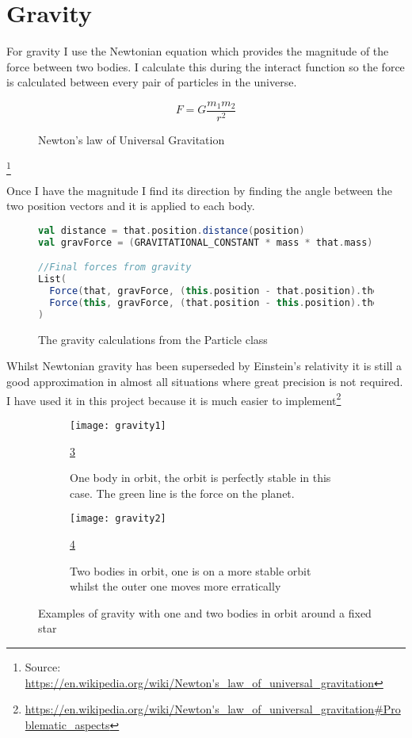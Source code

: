 \section{Gravity}
	For gravity I use the Newtonian equation which provides the magnitude of the force between two bodies. I calculate this during the interact function so the force is calculated between every pair of particles in the universe.
	\begin{figure}[h]
		\begin{equation}
		F = G\frac{m_{1}m_{2}}{r^{2}}
		\end{equation}
		\caption{Newton's law of Universal Gravitation}
		\label{fig:gravEqn}
	\end{figure}\footnote{Source: \url{https://en.wikipedia.org/wiki/Newton's_law_of_universal_gravitation}}
	
	Once I have the magnitude I find its direction by finding the angle between the two position vectors and it is applied to each body.
	\begin{figure}[h]
		\centering
		\begin{lstlisting}[language=Scala]
val distance = that.position.distance(position)
val gravForce = (GRAVITATIONAL_CONSTANT * mass * that.mass) / Math.pow(distance, 2)

//Final forces from gravity
List(
  Force(that, gravForce, (this.position - that.position).theta),
  Force(this, gravForce, (that.position - this.position).theta)
)
		\end{lstlisting}
		\caption{The gravity calculations from the Particle class}
		\label{fig:gravCode}
	\end{figure}
	
	Whilst Newtonian gravity has been superseded by Einstein's relativity it is still a good approximation in almost all situations where great precision is not required. I have used it in this project because it is much easier to implement\footnote{\url{https://en.wikipedia.org/wiki/Newton's_law_of_universal_gravitation\#Problematic_aspects}}
	
	\begin{figure}[p]
		\centering
		\begin{subfigure}{0.9\textwidth}
			\centering
			\texttt{[image: gravity1]}
			\caption{One body in orbit, the orbit is perfectly stable in this case. The green line is the force on the planet.}
			\label{fig:gravExamplesSub1}
			\ref{fig:gravExamplesSub1}
		\end{subfigure}
		\begin{subfigure}{0.9\textwidth}
			\centering
			\texttt{[image: gravity2]}
			\caption{Two bodies in orbit, one is on a more stable orbit whilst the outer one moves more erratically} 
			\label{fig:gravExamplesSub2}
			\ref{fig:gravExamplesSub2}
		\end{subfigure}	
		\caption{Examples of gravity with one and two bodies in orbit around a fixed star}
		\label{fig:gravExamples}
	\end{figure}